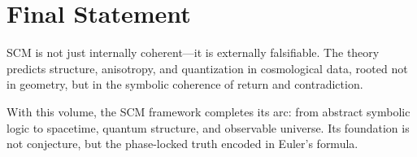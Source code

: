\section{Final Statement}

SCM is not just internally coherent—it is externally falsifiable. The theory predicts structure, anisotropy, and quantization in cosmological data, rooted not in geometry, but in the symbolic coherence of return and contradiction.

With this volume, the SCM framework completes its arc: from abstract symbolic logic to spacetime, quantum structure, and observable universe. Its foundation is not conjecture, but the phase-locked truth encoded in Euler’s formula.
